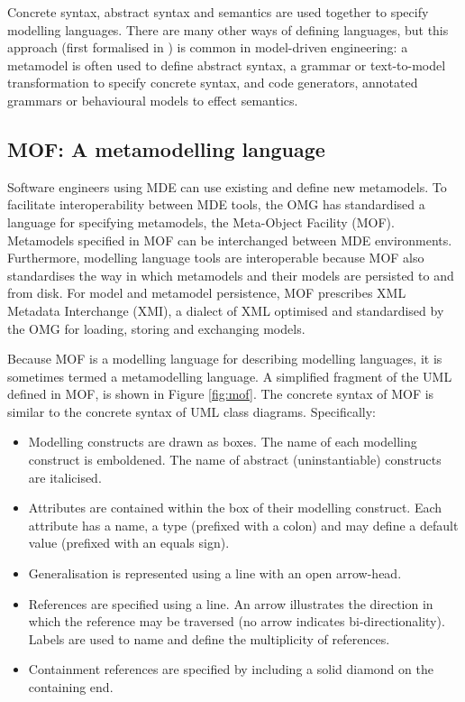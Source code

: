 Concrete syntax, abstract syntax and semantics are used together to specify modelling languages. There are many other ways of defining languages, but this approach (first formalised in \cite{alvarez01mml}) is common in model-driven engineering: a metamodel is often used to define abstract syntax, a grammar or text-to-model transformation to specify concrete syntax, and code generators, annotated grammars or behavioural models to effect semantics.

\subsection{MOF: A metamodelling language}
\label{subsec:mof}
Software engineers using MDE can use existing and define new metamodels. To facilitate interoperability between MDE tools, the OMG has standardised a language for specifying metamodels, the Meta-Object Facility (MOF). Metamodels specified in MOF can be interchanged between MDE environments. Furthermore, modelling language tools are interoperable because MOF also standardises the way in which metamodels and their models are persisted to and from disk. For model and metamodel persistence, MOF prescribes XML Metadata Interchange (XMI), a dialect of XML optimised and standardised by the OMG for loading, storing and exchanging models.

Because MOF is a modelling language for describing modelling languages, it is sometimes termed a metamodelling language. A simplified fragment of the UML defined in MOF, is shown in Figure \ref{fig:mof}. The concrete syntax of MOF is similar to the concrete syntax of UML class diagrams. Specifically:

\begin{itemize}
 \item Modelling constructs are drawn as boxes. The name of each modelling construct is emboldened. The name of abstract (uninstantiable) constructs are italicised.
 \item Attributes are contained within the box of their modelling construct. Each attribute has a name, a type (prefixed with a colon) and may define a default value (prefixed with an equals sign).
 \item Generalisation is represented using a line with an open arrow-head.
 \item References are specified using a line. An arrow illustrates the direction in which the reference may be traversed (no arrow indicates bi-directionality). Labels are used to name and define the multiplicity of references.
 \item Containment references are specified by including a solid diamond on the containing end.
\end{itemize}

